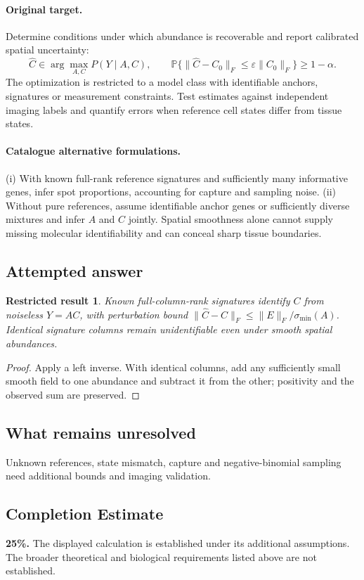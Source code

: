 \documentclass[11pt]{article}
\newcommand{\Prob}{\mathbb P}
\providecommand{\Prob}{\mathbb P}
\newtheorem{attemptresult}{Restricted result}[section]
\begin{document}
\paragraph{Original target.}
Determine conditions under which abundance is recoverable and report calibrated spatial uncertainty:
\[\widehat C\in\arg\max_{A,C}P(Y\mid A,C),\qquad \Prob\{\|\widehat C-C_0\|_F\le\varepsilon\|C_0\|_F\}\ge1-\alpha.\]
The optimization is restricted to a model class with identifiable anchors, signatures or measurement constraints. Test estimates against independent imaging labels and quantify errors when reference cell states differ from tissue states.
\paragraph{Catalogue alternative formulations.}
(i) With known full-rank reference signatures and sufficiently many informative genes, infer spot proportions, accounting for capture and sampling noise. (ii) Without pure references, assume identifiable anchor genes or sufficiently diverse mixtures and infer $A$ and $C$ jointly. Spatial smoothness alone cannot supply missing molecular identifiability and can conceal sharp tissue boundaries.
\subsection{Attempted answer}
\begin{attemptresult}
Known full-column-rank signatures identify $C$ from noiseless $Y=AC$, with perturbation bound $\|\widehat C-C\|_F\leq\|E\|_F/\sigma_{\min}(A)$. Identical signature columns remain unidentifiable even under smooth spatial abundances.
\end{attemptresult}
\begin{proof}
Apply a left inverse. With identical columns, add any sufficiently small smooth field to one abundance and subtract it from the other; positivity and the observed sum are preserved.
\end{proof}
\subsection{What remains unresolved}
Unknown references, state mismatch, capture and negative-binomial sampling need additional bounds and imaging validation.
\subsection{Completion Estimate}
\textbf{25\%.} The displayed calculation is established under its additional assumptions. The broader theoretical and biological requirements listed above are not established.
\end{document}
